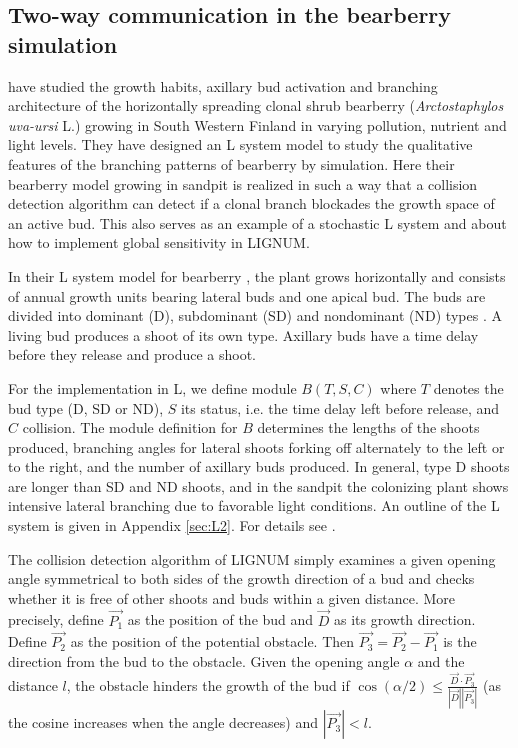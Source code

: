 \subsection{Two-way communication in the bearberry simulation}
\label{sec:bearberry}

\citet{salemaa:02}  have  studied  the  growth  habits,  axillary  bud
activation  and branching architecture  of the  horizontally spreading
clonal shrub  bearberry (\textit{Arctostaphylos uva-ursi} L.)  growing
in  South Western  Finland in  varying pollution,  nutrient  and light
levels.  They have designed an L system model to study the qualitative
features of  the branching patterns of bearberry  by simulation.  Here
their bearberry  model growing  in sandpit is  realized in such  a way
that a  collision detection  algorithm can detect  if a  clonal branch
blockades the growth  space of an active bud.  This  also serves as an
example  of a  stochastic  L  system \citep{pp:90}  and  about how  to
implement global sensitivity \citep{kurth:94} in LIGNUM.

In their  L system model  for bearberry \citep{salemaa:02},  the plant
grows horizontally and consists of annual growth units bearing lateral
buds  and one apical  bud.  The  buds are  divided into  dominant (D),
subdominant  (SD) and nondominant  (ND) types  \citep{remphrey:83}.  A
living bud  produces a shoot  of its own  type.  Axillary buds  have a
time delay before they release and produce a shoot.

For the  implementation in  L, we define  module $B(T,S,C)$  where $T$
denotes the  bud type (D,  SD or ND),  $S$ its status, i.e.   the time
delay left  before release, and $C$ collision.   The module definition
for  $B$ determines  the  lengths of  the  shoots produced,  branching
angles for  lateral shoots forking off  alternately to the  left or to
the right, and the number of axillary buds produced.  In general, type
D shoots  are longer  than SD and  ND shoots,  and in the  sandpit the
colonizing plant  shows intensive  lateral branching due  to favorable
light conditions.   An outline  of the L  system is given  in Appendix
\ref{sec:L2}.  For details see \citet{salemaa:02}.

The collision  detection algorithm of  LIGNUM simply examines  a given
opening angle symmetrical  to both sides of the  growth direction of a
bud and  checks whether it is free  of other shoots and  buds within a
given distance.   More precisely, define $\vec {P_1}$  as the position
of the bud and $\vec D$  as its growth direction.  Define $\vec {P_2}$
as the  position of  the potential obstacle.  Then $\vec {P_3}  = \vec
{P_2}
- \vec {P_1}$  is the direction from  the bud to  the obstacle.  Given
the opening angle $\alpha$ and  the distance $l$, the obstacle hinders
the growth  of the  bud if $\cos(\alpha/2)  \leq \frac{{\vec  D} \cdot
{\vec {P_3}}}  {|\vec D||\vec {P_3}|}$  (as the cosine  increases when
the angle decreases) and $|\vec {P_3}| < l$.

